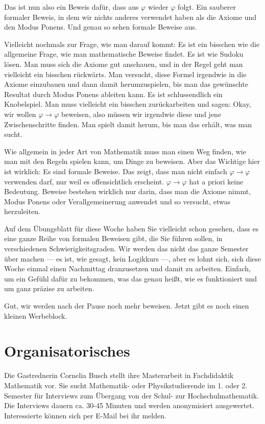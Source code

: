 \begin{spoken-clean}[00:38:57 - 00:41:28]
Das ist nun also ein Beweis dafür, dass aus $\varphi$ wieder $\varphi$ folgt. Ein sauberer formaler Beweis, in dem wir nichts anderes verwendet haben als die Axiome und den Modus Ponens. Und genau so sehen formale Beweise aus. 

Vielleicht nochmals zur Frage, wie man darauf kommt: Es ist ein bisschen wie die allgemeine Frage, wie man mathematische Beweise findet. Es ist wie Sudoku lösen. Man muss sich die Axiome gut anschauen, und in der Regel geht man vielleicht ein bisschen rückwärts. Man versucht, diese Formel irgendwie in die Axiome einzubauen und dann damit herumzuspielen, bis man das gewünschte Resultat durch Modus Ponens ableiten kann. Es ist schlussendlich ein Knobelspiel. Man muss vielleicht ein bisschen zurückarbeiten und sagen: Okay, wir wollen $\varphi \to \varphi$ beweisen, also müssen wir irgendwie diese und jene Zwischenschritte finden. Man spielt damit herum, bis man das erhält, was man sucht.

Wie allgemein in jeder Art von Mathematik muss man einen Weg finden, wie man mit den Regeln spielen kann, um Dinge zu beweisen. Aber das Wichtige hier ist wirklich: Es sind formale Beweise. Das zeigt, dass man nicht einfach $\varphi \to \varphi$ verwenden darf, nur weil es offensichtlich erscheint. $\varphi \to \varphi$ hat a priori keine Bedeutung. Beweise bestehen wirklich nur darin, dass man die Axiome nimmt, Modus Ponens oder Verallgemeinerung anwendet und so versucht, etwas herzuleiten. 

Auf dem Übungsblatt für diese Woche haben Sie vielleicht schon gesehen, dass es eine ganze Reihe von formalen Beweisen gibt, die Sie führen sollen, in verschiedenen Schwierigkeitsgraden. Wir werden das nicht das ganze Semester über machen --- es ist, wie gesagt, kein Logikkurs ---, aber es lohnt sich, sich diese Woche einmal einen Nachmittag dranzusetzen und damit zu arbeiten. Einfach, um ein Gefühl dafür zu bekommen, was das genau heißt, wie es funktioniert und um ganz präzise zu arbeiten.

Gut, wir werden nach der Pause noch mehr beweisen. Jetzt gibt es noch einen kleinen Werbeblock.
\end{spoken-clean}

\section{Organisatorisches}

\begin{meta-note}
Die Gastrednerin Cornelia Busch stellt ihre Masterarbeit in Fachdidaktik Mathematik vor. Sie sucht Mathematik- oder Physikstudierende im 1. oder 2. Semester für Interviews zum Übergang von der Schul- zur Hochschulmathematik. Die Interviews dauern ca. 30-45 Minuten und werden anonymisiert ausgewertet. Interessierte können sich per E-Mail bei ihr melden.
\end{meta-note}

